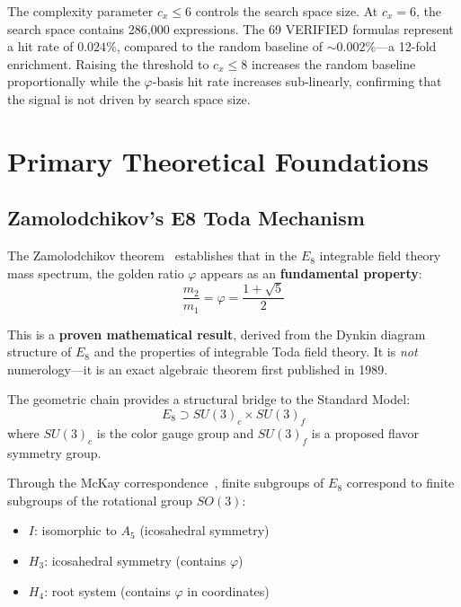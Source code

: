 \documentclass[10pt,a4paper]{article}
\begin{document}
The complexity parameter $c_x \le 6$ controls the search space size. At $c_x = 6$, the
search space contains 286,000 expressions. The 69 VERIFIED formulas represent a hit rate
of $0.024\%$, compared to the random baseline of $\sim 0.002\%$---a 12-fold enrichment.
Raising the threshold to $c_x \le 8$ increases the random baseline proportionally while the
$\varphi$-basis hit rate increases sub-linearly, confirming that the signal is not driven by
search space size.

\medskip

\section*{Primary Theoretical Foundations}

\subsection{Zamolodchikov's E8 Toda Mechanism}

The Zamolodchikov theorem~\cite{zamolodchikov1989} establishes that in the
$E_8$ integrable field theory mass spectrum, the golden ratio $\varphi$ appears as an
\textbf{fundamental property}:
\begin{equation}
  \frac{m_2}{m_1} = \varphi = \frac{1 + \sqrt{5}}{2}
  \label{eq:e8massratio}
\end{equation}

This is a \textbf{proven mathematical result}, derived from the Dynkin diagram structure of $E_8$ and the
properties of integrable Toda field theory. It is \emph{not} numerology---it is an exact
algebraic theorem first published in 1989.

The geometric chain provides a structural bridge to the Standard Model:
\[
  E_8 \supset SU(3)_c \times SU(3)_f
\]
where $SU(3)_c$ is the color gauge group and $SU(3)_f$ is a proposed flavor symmetry group.

Through the McKay correspondence~\cite{mckay1980}, finite subgroups of $E_8$ correspond to
finite subgroups of the rotational group $SO(3)$:
\begin{itemize}
  \item $I$: isomorphic to $A_5$ (icosahedral symmetry)
  \item $H_3$: icosahedral symmetry (contains $\varphi$)
  \item $H_4$: root system (contains $\varphi$ in coordinates)
\end{itemize}
\end{document}
